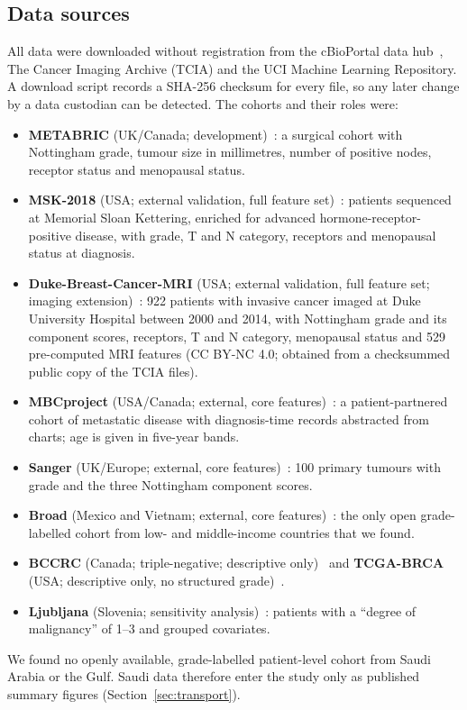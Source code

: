 \subsection{Data sources}
All data were downloaded without registration from the cBioPortal data
hub~\citep{cerami2012cbio,gao2013cbio}, The Cancer Imaging Archive (TCIA) and the UCI Machine Learning
Repository. A download script records a SHA-256 checksum for every file, so any later change by a data
custodian can be detected. The cohorts and their roles were:
\begin{itemize}[leftmargin=*,itemsep=1pt,topsep=2pt]
\item \textbf{METABRIC} (UK/Canada; development)~\citep{curtis2012metabric,pereira2016metabric}: a
surgical cohort with Nottingham grade, tumour size in millimetres, number of positive nodes,
receptor status and menopausal status.
\item \textbf{MSK-2018} (USA; external validation, full feature set)~\citep{razavi2018msk}: patients
sequenced at Memorial Sloan Kettering, enriched for advanced hormone-receptor-positive disease, with
grade, T and N category, receptors and menopausal status at diagnosis.
\item \textbf{Duke-Breast-Cancer-MRI} (USA; external validation, full feature set; imaging
extension)~\citep{saha2018duke}: 922 patients with invasive cancer imaged at Duke University
Hospital between 2000 and 2014, with Nottingham grade and its component scores, receptors, T and N
category, menopausal status and 529 pre-computed MRI features (CC BY-NC 4.0; obtained from a
checksummed public copy of the TCIA files).
\item \textbf{MBCproject} (USA/Canada; external, core features)~\citep{mbcproject2022,jain2023mbcproject}:
a patient-partnered cohort of metastatic disease with diagnosis-time records abstracted from charts;
age is given in five-year bands.
\item \textbf{Sanger} (UK/Europe; external, core features)~\citep{stephens2012sanger}: 100 primary
tumours with grade and the three Nottingham component scores.
\item \textbf{Broad} (Mexico and Vietnam; external, core features)~\citep{banerji2012broad}: the only
open grade-labelled cohort from low- and middle-income countries that we found.
\item \textbf{BCCRC} (Canada; triple-negative; descriptive only)~\citep{shah2012bccrc} and
\textbf{TCGA-BRCA} (USA; descriptive only, no structured grade)~\citep{tcga2012brca}.
\item \textbf{Ljubljana} (Slovenia; sensitivity analysis)~\citep{zwitter1988ljubljana}: \NLj{}
patients with a ``degree of malignancy'' of 1--3 and grouped covariates.
\end{itemize}
We found no openly available, grade-labelled patient-level cohort from Saudi Arabia or the Gulf.
Saudi data therefore enter the study only as published summary figures
(Section~\ref{sec:transport}).

